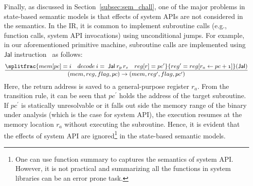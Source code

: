 Finally, as discussed in Section~\ref{subsec:sem_chall}, one of the major problems in state-based semantic models is that effects of system APIs are not considered in the semantics. In the IR, it is common to implement subroutine calls (e.g., function calls, system API invocations) using unconditional jumps. For example, in our aforementioned primitive machine, subroutine calls are implemented using $\mathsf{Jal}$ instruction~\cite{de2015micro} as follows:
\begin{equation*}
\small
\begin{aligned}
\mathnormal{\frac{ \splitfrac{mem[pc]=i \quad decode \: i = \; \mathsf{Jal} \: r_p\, r_s \quad reg[r]=pc^\prime}{ reg^\prime = reg[r_a \leftarrow pc+1] \hfill}\mathsf{(Jal)}}{( mem, reg, flag, pc ) \rightarrow ( mem, reg^\prime, flag, pc^\prime)}}
\end{aligned}
\end{equation*}
Here, the return address is saved to a general-purpose register $r_a$. From the transition rule, it can be seen that $pc^\prime$ holds the address of the target subroutine. If $pc^\prime$ is statically unresolvable or it falls out side the memory range of the binary under analysis (which is the case for system API), the execution resumes at the memory location $r_a$ without executing the subroutine. Hence, it is evident that the effects of system API are ignored\footnote{One can use function summary to captures the semantics of system API. However, it is not practical and summarizing all the functions in system libraries can be an error prone task.} in the state-based semantic models. %





